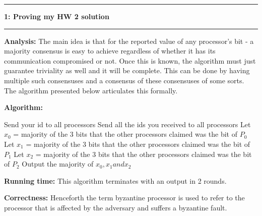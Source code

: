 \documentclass[11pt]{article}
\newcommand\question[2]{\vspace{.25in}\hrule\textbf{#1: #2}\vspace{.5em}\hrule\vspace{.10in}}
\newcommand\analysis{\vspace{.10in}\textbf{Analysis: }\newline}
\newcommand\algorithm{\vspace{.10in}\textbf{Algorithm: }}
\newcommand\correctness{\vspace{.10in}\textbf{Correctness: }\newline}
\newcommand\runtime{\vspace{.10in}\textbf{Running time: }\newline}
\begin{document}
\raggedright
\newcommand\NAME{Siddharth Joshi}  %
\newcommand\HWNUM{}              %


\question{1}{Proving my HW 2 solution} 
\analysis
The main idea is that for the reported value of any processor's bit - a majority consensus is easy to achieve regardless of whether it has its communication compromised or not. Once this is known, the algorithm must just guarantee triviality as well and it will be complete. This can be done by having multiple such consensuses and a consensus of these consensuses of some sorts. The algorithm presented below articulates this formally. 

\algorithm
\begin{algorithmic}
\State Send your id to all processors 
\State Send all the ids you received to all processors 
\State Let $x_0$ = majority of the 3 bits that the other processors claimed was the bit of $P_0$
\State Let $x_1$ = majority of the 3 bits that the other processors claimed was the bit of $P_1$
\State Let $x_2$ = majority of the 3 bits that the other processors claimed was the bit of $P_2$
\State Output the majority of $x_0, x_1 and x_2$
\end{algorithmic}

\runtime
This algorithm terminates with an output in 2 rounds.

\correctness
Henceforth the term byzantine processor is used to refer to the processor that is affected by the adversary and suffers a byzantine fault. \newline
\end{document}
